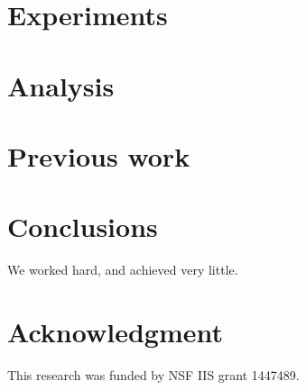 \documentclass[10pt]{proc}
\begin{document}
\section{Experiments}\label{experiments}

\section{Analysis}\label{analysis}

\section{Previous work}\label{previous work}

\section{Conclusions}\label{conclusions}
We worked hard, and achieved very little.

\section*{Acknowledgment}
This research was funded by NSF IIS grant 1447489.




\end{document}
